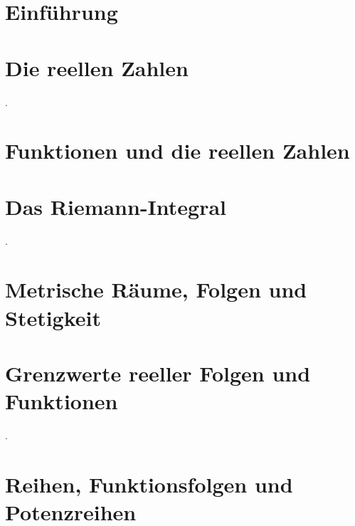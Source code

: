 \documentclass[11pt]{report}
\begin{document}
	  
  \linespread{1.2}

  

  \chapter{Einführung}


  \chapter{Die reellen Zahlen}
	.
	
	\chapter{Funktionen und die reellen Zahlen}
	
  \chapter{Das Riemann-Integral}
	.
	
  \chapter{Metrische Räume, Folgen und Stetigkeit}
	
	
	
	
  \chapter{Grenzwerte reeller Folgen und Funktionen}
 	.
 	
	
  \chapter{Reihen, Funktionsfolgen und Potenzreihen}
  
  
	
	
\end{document}
